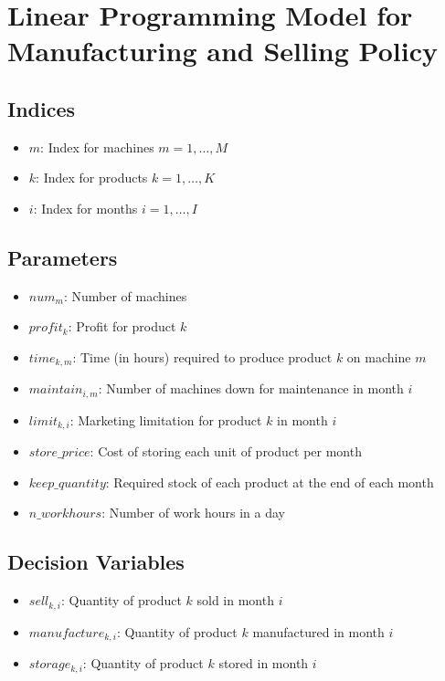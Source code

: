 \documentclass{article}
\begin{document}
\section*{Linear Programming Model for Manufacturing and Selling Policy}

\subsection*{Indices}
\begin{itemize}
    \item \( m \): Index for machines \( m = 1, \ldots, M \)
    \item \( k \): Index for products \( k = 1, \ldots, K \)
    \item \( i \): Index for months \( i = 1, \ldots, I \)
\end{itemize}

\subsection*{Parameters}
\begin{itemize}
    \item \( num_{m} \): Number of machines
    \item \( profit_{k} \): Profit for product \( k \)
    \item \( time_{k,m} \): Time (in hours) required to produce product \( k \) on machine \( m \)
    \item \( maintain_{i,m} \): Number of machines down for maintenance in month \( i \)
    \item \( limit_{k,i} \): Marketing limitation for product \( k \) in month \( i \)
    \item \( store\_price \): Cost of storing each unit of product per month
    \item \( keep\_quantity \): Required stock of each product at the end of each month
    \item \( n\_workhours \): Number of work hours in a day
\end{itemize}

\subsection*{Decision Variables}
\begin{itemize}
    \item \( sell_{k,i} \): Quantity of product \( k \) sold in month \( i \)
    \item \( manufacture_{k,i} \): Quantity of product \( k \) manufactured in month \( i \)
    \item \( storage_{k,i} \): Quantity of product \( k \) stored in month \( i \)
\end{itemize}
\end{document}
